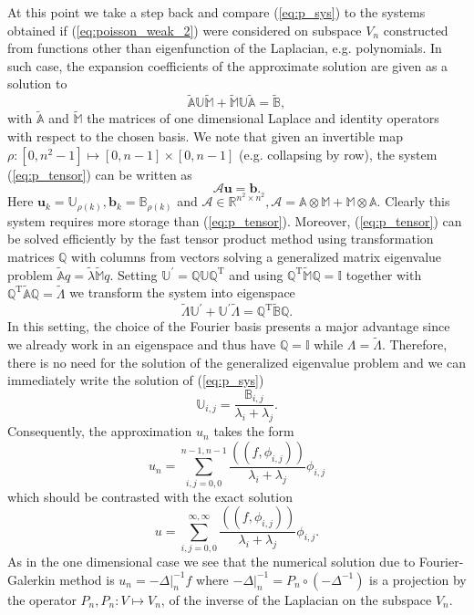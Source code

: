\documentclass[a4paper,10pt]{article}
\newcommand{\R}{\ensuremath{\mathbb{R}}}
\newcommand{\Inner}[2]{\ensuremath{\left(\left(#1, #2\right)\right)}}
\begin{document}
  At this point we take a step back and compare (\ref{eq:p_sys}) to the systems
  obtained if (\ref{eq:poisson_weak_2}) were considered on subspace $V_n$
  constructed from functions other than eigenfunction of the Laplacian, e.g.
  polynomials. In such case, the expansion coefficients of the approximate
  solution are given as a solution to 
  \begin{equation}
    \label{eq:p_tensor}
    \tilde{\mathbb{A}}\mathbb{U}\tilde{\mathbb{M}} +
    \tilde{\mathbb{M}}\mathbb{U}\tilde{\mathbb{A}} =
    \tilde{\mathbb{B}},
  \end{equation} 
  with $\tilde{\mathbb{A}}$ and $\tilde{\mathbb{M}}$ the matrices of one
  dimensional Laplace and identity operators with respect to the chosen basis.
  We note that given an invertible map 
  $\rho:\left[0, n^2-1\right]\mapsto\left[0, n-1\right]\times\left[0, n-1\right]$
  (e.g. collapsing by row), the system (\ref{eq:p_tensor}) can be written as
  \[
  \mathcal{A}\mathbf{u} = \mathbf{b}.
  \]
  Here $\mathbf{u}_{k}=\mathbb{U}_{\rho(k)}, \mathbf{b}_{k}=\mathbb{B}_{\rho(k)}$
  and $\mathcal{A}\in\R^{n^2\times n^2}, \mathcal{A}=\mathbb{A}\otimes\mathbb{M}
  +\mathbb{M}\otimes\mathbb{A}$. Clearly this system requires more storage than
  (\ref{eq:p_tensor}). Moreover, (\ref{eq:p_tensor}) can be solved efficiently
  by the fast tensor product method using transformation matrices $\mathbb{Q}$
  with columns from vectors solving a generalized matrix eigenvalue problem
  $\tilde{\mathbb{A}}q=\tilde{\lambda}\tilde{\mathbb{M}}q$. Setting 
  $\mathbb{U}^\prime = \mathbb{Q}\mathbb{U}\mathbb{Q}^{\text{T}}$ and using
  $\mathbb{Q}^{\text{T}}\tilde{\mathbb{M}}\mathbb{Q}=\mathbb{I}$ together with
  $\mathbb{Q}^{\text{T}}\tilde{\mathbb{A}}\mathbb{Q}=\tilde{\Lambda}$ we
  transform the system into eigenspace
  \[
    \tilde{\Lambda}\mathbb{U}^{\prime} + \mathbb{U}^{\prime}\tilde{\Lambda} = 
    \mathbb{Q}^{\text{T}}\tilde{\mathbb{B}}\mathbb{Q}.
  \]
  In this setting, the choice of the Fourier basis presents a major advantage
  since we already work in an eigenspace and thus have $\mathbb{Q}=\mathbb{I}$
  while $\Lambda = \tilde{\Lambda}$. Therefore, there is no need for the solution
  of the generalized eigenvalue problem and we can immediately write the
  solution of (\ref{eq:p_sys})
  \[
    \mathbb{U}_{i, j} = \frac{\mathbb{B}_{i, j}}{\lambda_i + \lambda_j}.
  \]
  Consequently, the approximation $u_n$ takes the form
  \[
    u_n = \sum\limits_{i, j = 0, 0}^{n-1, n-1}\frac{\Inner{f}{\phi_{i, j}}}{\lambda_i + \lambda_j}
    \phi_{i, j}
  \]
  which should be contrasted with the exact solution
  \[
    u = \sum\limits_{i, j = 0, 0}^{\infty, \infty}\frac{\Inner{f}{\phi_{i, j}}}{\lambda_i + \lambda_j}
    \phi_{i, j}.
  \]
  As in the one dimensional case we see that the numerical solution due to
  Fourier-Galerkin method is $u_n = -\Delta|_{n}^{-1}f$ where
  $-\Delta|_{n}^{-1}=P_n \circ \left(-\Delta^{-1}\right)$ is a projection by 
  the operator $P_n, P_n:V\mapsto V_n$, of the inverse of the Laplacian on the
  subspace $V_n$.
\end{document}

